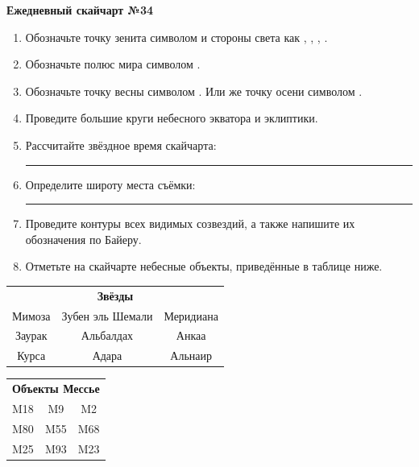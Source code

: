 \documentclass{./SAS-class-skygen}
\begin{document}
    
    
    
	\begin{center}
		\large\textbf{Ежедневный скайчарт №34}
	\end{center}

	\begin{enumerate}
		\item Обозначьте точку зенита символом  и стороны света как , , , .
		\item Обозначьте полюс мира символом .
		\item Обозначьте точку весны символом \Aries. Или же точку осени символом \Libra.
		\item Проведите большие круги небесного экватора и эклиптики.
		\item Рассчитайте звёздное время скайчарта: \rule{2cm}{0.4pt}
		\item Определите широту места съёмки: \rule{2cm}{0.4pt}
		\item Проведите контуры всех видимых созвездий, а также напишите их обозначения по Байеру.
		\item Отметьте на скайчарте небесные объекты, приведённые в таблице ниже.
	\end{enumerate}
	
    \vspace{0.5cm}

    \begin{table}[h!]
    \centering
    \begin{tabular}{ccc}
    \multicolumn{3}{c}{\textbf{Звёзды}} \\ Мимоза & Зубен эль Шемали & Меридиана \\
Заурак & Альбалдах & Анкаа \\
Курса & Адара & Альнаир \\

\end{tabular}
    \hfill
    \begin{tabular}{ccc}
    \multicolumn{3}{c}{\textbf{Объекты Мессье}} \\ M18 & M9 & M2 \\
M80 & M55 & M68 \\
M25 & M93 & M23 \\

\end{tabular}
    \end{table}
	
\end{document}
